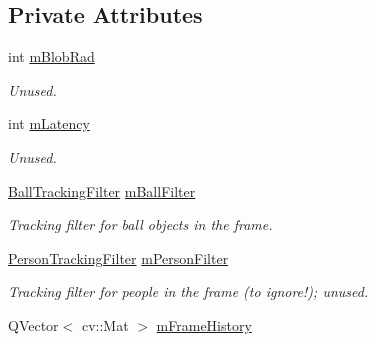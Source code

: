 \subsection*{Private Attributes}
\begin{DoxyCompactItemize}
\item 
int \hyperlink{classKFBallTracker_a00fa3a5aeb1f630859a5612b8866fb81}{m\+Blob\+Rad}\hypertarget{classKFBallTracker_a00fa3a5aeb1f630859a5612b8866fb81}{}\label{classKFBallTracker_a00fa3a5aeb1f630859a5612b8866fb81}

\begin{DoxyCompactList}\small\item\em Unused. \end{DoxyCompactList}\item 
int \hyperlink{classKFBallTracker_afa1b1acd100b4ed38768b3287cf69be9}{m\+Latency}\hypertarget{classKFBallTracker_afa1b1acd100b4ed38768b3287cf69be9}{}\label{classKFBallTracker_afa1b1acd100b4ed38768b3287cf69be9}

\begin{DoxyCompactList}\small\item\em Unused. \end{DoxyCompactList}\item 
\hyperlink{classBallTrackingFilter}{Ball\+Tracking\+Filter} \hyperlink{classKFBallTracker_aa46af76938969046630293640f542648}{m\+Ball\+Filter}\hypertarget{classKFBallTracker_aa46af76938969046630293640f542648}{}\label{classKFBallTracker_aa46af76938969046630293640f542648}

\begin{DoxyCompactList}\small\item\em Tracking filter for ball objects in the frame. \end{DoxyCompactList}\item 
\hyperlink{classPersonTrackingFilter}{Person\+Tracking\+Filter} \hyperlink{classKFBallTracker_adeaffc37a8aa27b01984361bbe250ebd}{m\+Person\+Filter}\hypertarget{classKFBallTracker_adeaffc37a8aa27b01984361bbe250ebd}{}\label{classKFBallTracker_adeaffc37a8aa27b01984361bbe250ebd}

\begin{DoxyCompactList}\small\item\em Tracking filter for people in the frame (to ignore!); unused. \end{DoxyCompactList}\item 
Q\+Vector$<$ cv\+::\+Mat $>$ \hyperlink{classKFBallTracker_a6b6dd83a004647590a28c45b540b1cea}{m\+Frame\+History}\hypertarget{classKFBallTracker_a6b6dd83a004647590a28c45b540b1cea}{}\label{classKFBallTracker_a6b6dd83a004647590a28c45b540b1cea}


\end{DoxyCompactItemize}
